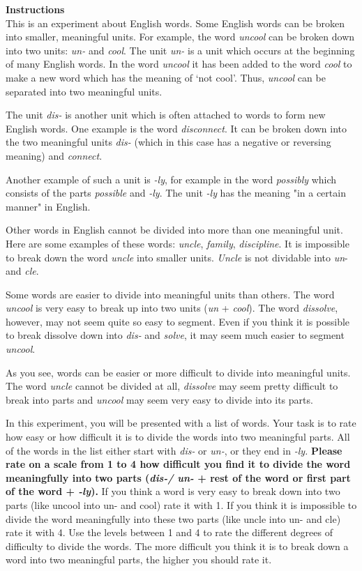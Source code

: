 \noindent  \textbf{Instructions}\\ 

\noindent  This is an experiment about English words. Some English words can be broken into smaller, meaningful units.
For example, the word \textit{uncool} can be broken down into two units: \textit{un-} and \textit{cool}. The unit \textit{un- }is a unit which occurs at the beginning of many English words. In the word \textit{uncool} it has been added to the word \textit{cool} to make a new word which has the meaning of ‘not cool’. Thus, \textit{uncool} can be separated into two meaningful units.

The unit \textit{dis-} is another unit which is often attached to words to form new English words. One example is the word \textit{disconnect}. It can be broken down into the two meaningful units \textit{dis- }(which in this case has a negative or reversing meaning) and \textit{connect}.

Another example of such a unit is \textit{-ly}, for example in the word \textit{possibly} which consists of the parts \textit{possible} and \textit{-ly}.  The unit\textit{ -ly }has the meaning "in a certain manner" in English.

Other words in English cannot be divided into more than one meaningful unit. Here are some examples of these words: \textit{uncle}, \textit{family}, \textit{discipline}. It is impossible to break down the word \textit{uncle} into smaller units. \textit{Uncle} is not dividable into \textit{un}- and \textit{cle}.

Some words are easier to divide into meaningful units than others. The word \textit{uncool} is very easy to break up into two units (\textit{un} + \textit{cool}). The word \textit{dissolve}, however, may not seem quite so easy to segment. Even if you think it is possible to break dissolve down into \textit{dis-} and \textit{solve}, it may seem much easier to segment \textit{uncool}.

As you see, words can be easier or more difficult to divide into meaningful units. The word \textit{uncle} cannot be divided at all, \textit{dissolve} may seem pretty difficult to break into parts and \textit{uncool} may seem very easy to divide into its parts. 

In this experiment, you will be presented with a list of words. Your task is to rate how easy or how difficult it is to divide the words into two meaningful parts. All of the words in the list either start with \textit{dis-} or \textit{un-}, or they end in \textit{-ly.} \textbf{Please rate on a scale from 1 to 4 how difficult you find it to divide the word meaningfully into two parts (\textit{dis-/ un-} + rest of the word or first part of the word + \textit{-ly}). }If you think a word is very easy to break down into two parts (like uncool into un- and cool) rate it with 1.  If you think it is impossible to divide the word meaningfully into these two parts (like uncle into un- and cle) rate it with 4. Use the levels between 1 and 4 to rate the different degrees of difficulty to divide the words. The more difficult you think it is to break down a word into two meaningful parts, the higher you should rate it.

